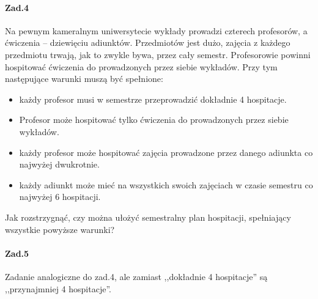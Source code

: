 \paragraph{Zad.4} Na pewnym kameralnym uniwersytecie wykłady prowadzi czterech profesorów, a ćwiczenia – dziewięciu adiunktów. Przedmiotów jest dużo, zajęcia z każdego przedmiotu trwają, jak to zwykle bywa,
przez cały semestr. Profesorowie powinni hospitować ćwiczenia do prowadzonych przez siebie wykładów.
Przy tym następujące warunki muszą być spełnione:
\begin{itemize}
\item każdy profesor musi w semestrze przeprowadzić dokładnie 4 hospitacje.
\item Profesor może hospitować tylko ćwiczenia do prowadzonych przez siebie wykładów.
\item każdy profesor może hospitować zajęcia prowadzone przez danego adiunkta co najwyżej dwukrotnie.
\item każdy adiunkt może mieć na wszystkich swoich zajęciach w czasie semestru co najwyżej 6 hospitacji.
\end{itemize}
Jak rozstrzygnąć, czy można ułożyć semestralny plan hospitacji, spełniający wszystkie powyższe warunki?

\paragraph{Zad.5} Zadanie analogiczne do zad.4, ale zamiast ,,dokładnie 4 hospitacje” są  ,,przynajmniej 4 hospitacje”.
